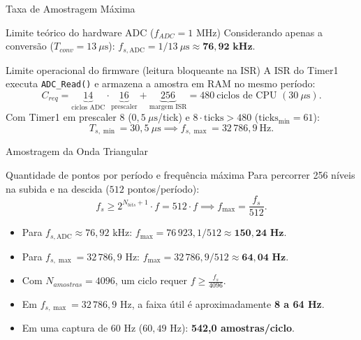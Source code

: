 \documentclass{beamer}
\begin{document}
\begin{frame}{Taxa de Amostragem Máxima}
\begin{block}{Limite teórico do hardware ADC ($f_{ADC} = 1\text{ MHz}$)}
Considerando apenas a conversão ($T_{conv} = 13\ \mu\text{s}$): $f_{s,\text{ADC}} = 1 / 13\ \mu\text{s} \approx \mathbf{76{,}92\text{ kHz}}$.
\end{block}

\begin{block}{Limite operacional do firmware (leitura bloqueante na ISR)}
A ISR do Timer1 executa \texttt{ADC\_Read()} e armazena a amostra em RAM no mesmo período:
\[
C_{req} = \underbrace{14}_{\text{ciclos ADC}} \cdot \underbrace{16}_{\text{prescaler}} + \underbrace{256}_{\text{margem ISR}} = 480\ \text{ciclos de CPU } (30\ \mu\text{s}).
\]
Com Timer1 em prescaler 8 ($0{,}5\ \mu\text{s}$/tick) e $8 \cdot \text{ticks} > 480$ ($\text{ticks}_{\min} = 61$):
\[
T_{s,\min} = 30{,}5\ \mu\text{s} \implies \boxed{f_{s,\max} = 32\,786{,}9\ \text{Hz}}.
\]
\end{block}
\end{frame}

\begin{frame}{Amostragem da Onda Triangular}
\begin{block}{Quantidade de pontos por período e frequência máxima}
Para percorrer 256 níveis na subida e na descida ($512$ pontos/período):
\[
f_s \geq 2^{N_{bits}+1} \cdot f = 512 \cdot f \implies f_{\max} = \frac{f_s}{512}.
\]
\begin{itemize}
\item Para $f_{s,\text{ADC}} \approx 76{,}92\text{ kHz}$: $f_{\max} = 76\,923{,}1 / 512 \approx \mathbf{150{,}24\text{ Hz}}$.
\item Para $f_{s,\max} = 32\,786{,}9\text{ Hz}$: $f_{\max} = 32\,786{,}9 / 512 \approx \mathbf{64{,}04\text{ Hz}}$.
\end{itemize}
\end{block}
\begin{itemize}
\item Com $N_{amostras}=4096$, um ciclo requer $f \geq \frac{f_s}{4096}$.
\item Em $f_{s,\max} = 32\,786{,}9\text{ Hz}$, a faixa útil é aproximadamente \textbf{8 a 64 Hz}.
\item Em uma captura de $60\text{ Hz}$ ($60{,}49\text{ Hz}$): \textbf{542,0 amostras/ciclo}.
\end{itemize}
\end{frame}
\end{document}
